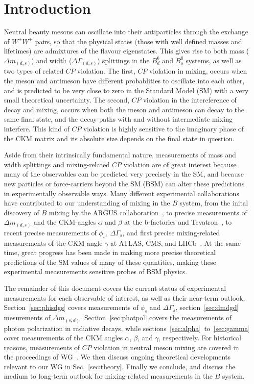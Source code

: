 \section{Introduction}
Neutral beauty mesons can oscillate into their antiparticles through the exchange of $W^\pm W^\mp$ pairs, so that the 
physical states (those with well defined masses and lifetimes) are admixtures of the flavour eigenstates. This gives
rise to both mass ($\Delta m_{(d,s)}$) and width ($\Delta\Gamma_{(d,s)}$) splittings in the $B^0_d$ and $B^0_s$ systems, as well
as two types of related $CP$ violation. The first, $CP$ violation in mixing, occurs when the meson and antimeson have different
probablities to oscillate into each other, and is predicted to be very close to zero in the Standard Model (SM) with a very
small theoretical uncertainty. The second, $CP$ violation in the intereference of decay and mixing, occurs when both the meson
and antimeson can decay to the same final state, and the decay paths with and without intermediate mixing interfere. This kind of $CP$
violation is highly sensitive to the imaginary phase of the CKM matrix and its absolute size depends on the final state in question.

Aside from their intrinsically fundamental nature, measurements of mass and width splittings and mixing-related $CP$ violation are
of great interest because many of the observables can be predicted very precisely in the SM, and because new particles or force-carriers
beyond the SM (BSM) can alter these predictions in experimentally observable ways. Many different experimental collaborations have contributed
to our understanding of mixing in the $B$ system, from the inital discovery of $B$ mixing by the ARGUS collaboration~\cite{}, to precise measurements
of $\Delta m_{(d,s)}$ and the CKM-angles $\alpha$ and $\beta$ at the b-factories and Tevatron~\cite{}, to recent precise measurements
of $\phi_s$, $\Delta\Gamma_s$, and first precise mixing-related measurements of the CKM-angle $\gamma$ at ATLAS, CMS, and LHCb~\cite{}. At the same
time, great progress has been made in making more precise theoretical predictions of the SM values of many of these quantities, making
these experimental measurements sensitive probes of BSM physics.

The remainder of this document covers the current status of experimental measurements for each observable of
interest, as well as their near-term outlook. Section~\ref{sec:phisdgs} covers measurements of $\phi_s$ and $\Delta\Gamma_s$, section~\ref{sec:dmdgd} 
mesurements of $\Delta m_{(s,d)}$. Section~\ref{sec:photpol} covers the measurements of photon polarization in radiative decays, while
sections~\ref{sec:alpha}~to~\ref{sec:gamma} cover measurements of the CKM angles $\alpha$, $\beta$, and $\gamma$, respectively.
For historical reasons, measurements of $CP$ violation in neutral meson mixing are covered in the proceedings of WG~\cite{}. We then discuss
ongoing theoretical developments relevant to our WG in Sec.~\ref{sec:theory}. Finally we conclude,
and discuss the medium to long-term outlook for mixing-related measurements in the $B$ system.


